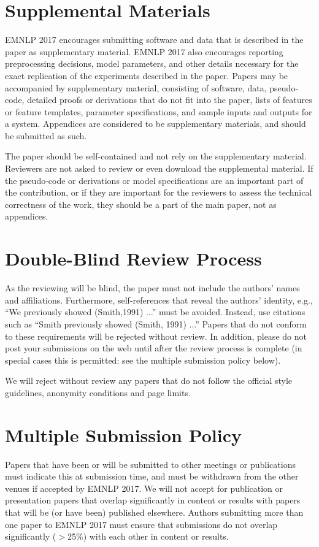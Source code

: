 \section{Supplemental Materials}
\label{sec:supplemental}

EMNLP 2017 encourages submitting software and data that is described in the paper as supplementary material. EMNLP 2017 also encourages reporting preprocessing decisions, model parameters, and other details necessary for the exact replication of the experiments described in the paper. Papers may be accompanied by supplementary material, consisting of software, data, pseudo-code, detailed proofs or derivations that do not fit into the paper, lists of features or feature templates, parameter specifications, and sample inputs and outputs for a system. Appendices are considered to be supplementary materials, and should be submitted as such.

The paper should be self-contained and not rely on the supplementary material. Reviewers are not asked to review or even download the supplemental material. If the pseudo-code or derivations or model specifications are an important part of the contribution, or if they are important for the reviewers to assess the technical correctness of the work, they should be a part of the main paper, not as appendices.


\section{Double-Blind Review Process}
\label{sec:blind}

As the reviewing will be blind, the paper must not include the authors' names and
affiliations.  Furthermore, self-references that reveal the authors' identity,
e.g., ``We previously showed (Smith,1991) ...'' must be avoided. Instead, use
citations such as ``Smith previously showed (Smith, 1991) ...'' Papers that do
not conform to these requirements will be rejected without review. In addition,
please do not post your submissions on the web until after the review process is
complete (in special cases this is permitted: see the multiple submission policy
below).

We will reject without review any papers that do not follow the official style
guidelines, anonymity conditions and page limits.

\section{Multiple Submission Policy}
Papers that have been or will be submitted to other meetings or publications must indicate this at submission time, and must be withdrawn from the other venues if accepted by EMNLP 2017. We will not accept for publication or presentation papers that overlap significantly in content or results with papers that will be (or have been) published elsewhere. Authors submitting more than one paper to EMNLP 2017 must ensure that submissions do not overlap significantly ($>$25\%) with each other in content or results.

